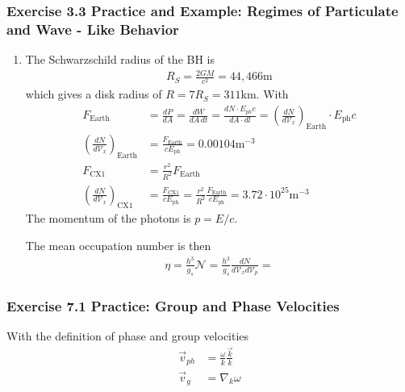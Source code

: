 \documentclass[10pt,a4paper]{article}
\theoremstyle{definition}
\begin{document}
\subsubsection{Exercise 3.3 Practice and Example: Regimes of Particulate and Wave - Like Behavior}
\begin{enumerate}[label=(\alph*)]
\item The Schwarzschild radius of the BH is
\begin{align}
    R_S=\frac{2GM}{c^2}=44,466\text{m}
\end{align}
which gives a disk radius of $R=7R_S=311\text{km}$.
With
\begin{align}
    F_\text{Earth}&=\frac{dP}{dA}=\frac{dW}{dA\,dt}=\frac{dN\cdot E_{ph} c}{dA\cdot
    dl}=\left(\frac{dN}{d\mathcal{V}_x}\right)_\text{Earth}\cdot E_\text{ph} c\\
    \left(\frac{dN}{d\mathcal{V}_x}\right)_\text{Earth}&=\frac{F_\text{Earth}}{cE_\text{ph}}=0.00104\text{m}^{-3}\\
    F_\text{CX1}&=\frac{r^2}{R^2}F_\text{Earth}\\
    \left(\frac{dN}{d\mathcal{V}_x}\right)_\text{CX1}&=\frac{F_\text{CX1}}{cE_\text{ph}}=\frac{r^2}{R^2}\frac{F_\text{Earth}}{cE_\text{ph}}=3.72\cdot10^{25}\text{m}^{-3}
\end{align}
The momentum of the photons is $p=E/c$.

The mean occupation number is then
\begin{align}
    \eta=\frac{h^3}{g_s}\mathcal{N}=\frac{h^3}{g_s}\frac{dN}{d\mathcal{V}_xd\mathcal{V}_p}=
\end{align}
\end{enumerate}


\subsubsection{Exercise 7.1 Practice: Group and Phase Velocities}
With the definition of phase and group velocities
\begin{align}
    \vec{v}_{ph}&=\frac{\omega}{k}\frac{\vec{k}}{k}\\
    \vec{v}_{g}&=\nabla_k{\omega}
\end{align}
\end{document}
